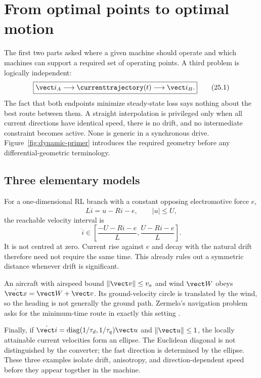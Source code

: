 \section{From optimal points to optimal motion}
\label{sec:dynamic-question}

The first two parts asked where a given machine should operate and which
machines can support a required set of operating points.  A third problem is
logically independent:
\[
 \boxed{\vect i_A\longrightarrow\currenttrajectory(t)\longrightarrow\vect i_B.}
 \tag{25.1}
\]
The fact that both endpoints minimize steady-state loss says nothing about the
best route between them.  A straight interpolation is privileged only when
all current directions have identical speed, there is no drift, and no
intermediate constraint becomes active.  None is generic in a synchronous
drive.  Figure~\ref{fig:dynamic-primer} introduces the required geometry
before any differential-geometric terminology.



\subsection{Three elementary models}

For a one-dimensional RL branch with a constant opposing electromotive force
\(e\),
\[
 L\dot i=u-Ri-e,\qquad |u|\leq U,
 \tag{25.2}
\]
the reachable velocity interval is
\[
 \dot i\in\left[\frac{-U-Ri-e}{L},\frac{U-Ri-e}{L}\right].
 \tag{25.3}
\]
It is not centred at zero.  Current rise against \(e\) and decay with the
natural drift therefore need not require the same time.  This already rules
out a symmetric distance whenever drift is significant.

An aircraft with airspeed bound \(\|\vect v\|\leq v_a\) and wind
\(\vect W\) obeys \(\dot{\vect x}=\vect W+\vect v\).  Its ground-velocity
circle is translated by the wind, so the heading is not generally the ground
path.  Zermelo's navigation problem asks for the minimum-time route in exactly
this setting \parencite{zermelo1931,bao2004}.

Finally, if \(\dot{\vect i}=\operatorname{diag}(1/\tau_d,1/\tau_q)\vect u\)
and \(\|\vect u\|\leq1\), the locally attainable current velocities form an
ellipse.  The Euclidean diagonal is not distinguished by the converter; the
fast direction is determined by the ellipse.  These three examples isolate
drift, anisotropy, and direction-dependent speed before they appear together
in the machine.

